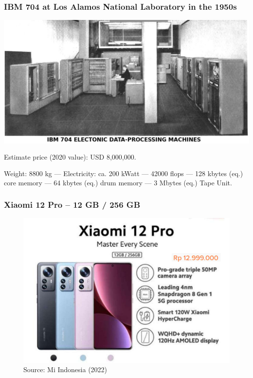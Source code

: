 \documentclass[aspectratio=169, xcolor=table, notheorems, hyperref={pdfpagelabels=false}]{beamer}
\begin{document}
\begin{frame}
\frametitle{IBM 704 at Los Alamos National Laboratory in the 1950s}
\includegraphics[width=0.75\linewidth]{os-ibm704}

Estimate price (2020 value): USD 8,000,000.

Weight: 8800 kg --- Electricity: ca. 200 kWatt --- 42000 flops --- 
128 kbytes (eq.) core memory --- 64 kbytes (eq.) drum memory --- 3 Mbytes (eq.) Tape Unit.

\end{frame}

\begin{frame}
\frametitle{Xiaomi 12 Pro -- 12 GB / 256 GB}
\begin{figure}
\includegraphics[width=0.63\linewidth]{xiaome12pro}
\caption{Source: Mi Indonesia (2022)}
\end{figure}
\end{frame}

\end{document}
